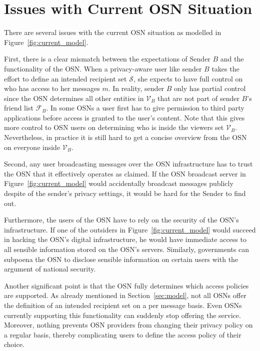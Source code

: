 \section{Issues with Current OSN Situation}
\label{sec:issues_with_current_osn_situation}
There are several issues with the current OSN situation as modelled in Figure~\ref{fig:current_model}.

First, there is a clear mismatch between the expectations of Sender $B$ and the functionality of the OSN. When a privacy-aware user like sender $B$ takes the effort to define an intended recipient set $\mathcal{S}$, she expects to have full control on who has access to her messages $m$. In reality, sender $B$ only has partial control since the OSN determines all other entities in $\mathcal{V}_B$ that are not part of sender $B$'s friend list $\mathcal{F}_B$. In some OSNs a user first has to give permission to third party applications before access is granted to the user's content. Note that this gives more control to OSN users on determining who is inside the viewers set $\mathcal{V}_B$. Nevertheless, in practice it is still hard to get a concise overview from the OSN on everyone inside $\mathcal{V}_B$.

Second, any user broadcasting messages over the OSN infrastructure has to trust the OSN that it effectively operates as claimed. If the OSN broadcast server in Figure~\ref{fig:current_model} would accidentally broadcast messages publicly despite of the sender's privacy settings, it would be hard for the Sender to find out.

Furthermore, the users of the OSN have to rely on the security of the OSN's infrastructure. If one of the outsiders in Figure~\ref{fig:current_model} would succeed in hacking the OSN's digital infrastructure, he would have immediate access to all sensible information stored on the OSN's servers. Similarly, governments can subpoena the OSN to disclose sensible information on certain users with the argument of national security.

Another significant point is that the OSN fully determines which access policies are supported. As already mentioned in Section~\ref{sec:model}, not all OSNs offer the definition of an intended recipient set on a per message basis. Even OSNs currently supporting this functionality can suddenly stop offering the service. Moreover, nothing prevents OSN providers from changing their privacy policy on a regular basis, thereby complicating users to define the access policy of their choice.

